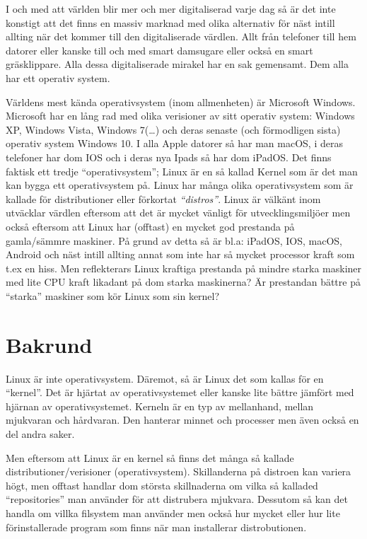\documentclass[a4paper, 12pt]{report}
\begin{document}
    I och med att världen blir mer och mer digitaliserad varje dag så är det inte konstigt att det finns en massiv marknad med olika alternativ för näst intill allting när det kommer till den digitaliserade värdlen. Allt från telefoner till hem datorer eller kanske till och med smart damsugare eller också en smart gräsklippare. Alla dessa digitaliserade mirakel har en sak gemensamt. Dem alla har ett operativ system.

    Världens mest kända operativsystem (inom allmenheten) är Microsoft Windows. Microsoft har en lång rad med olika verisioner av sitt operativ system\cite{windows}: Windows XP, Windows Vista, Windows 7(\dots) och deras senaste (och förmodligen sista) operativ system Windows 10.
     I alla Apple datorer så har man macOS, i deras telefoner har dom IOS och i deras nya Ipads så har dom iPadOS.
     Det finns faktisk ett tredje ``operativsystem''; Linux är en så kallad Kernel \cite{redhat} som är det man kan bygga ett operativsystem på. Linux har många olika operativsystem som är kallade för distributioner eller förkortat \textit{``distros''}. Linux är välkänt inom utväcklar värdlen eftersom att det är mycket vänligt för utvecklingsmiljöer men också eftersom att Linux har (offtast) en mycket god prestanda på gamla/sämmre maskiner. På grund av detta så är bl.a: iPadOS, IOS, macOS, Android och näst intill allting annat som inte har så mycket processor kraft som t.ex en hiss. Men reflekterars Linux kraftiga prestanda på mindre starka maskiner med lite CPU kraft likadant på dom starka maskinerna? Är prestandan bättre på ``starka'' maskiner som kör Linux som sin kernel?


\section{Bakrund}

    Linux är inte operativsystem. Däremot, så är Linux det som kallas för en ``kernel''\cite{redhat}. Det är hjärtat av operativsystemet eller kanske lite bättre jämfört med hjärnan av operativsystemet. Kerneln är en typ av mellanhand, mellan mjukvaran och hårdvaran. Den hanterar minnet och processer men även också en del andra saker.

    Men eftersom att Linux är en kernel så finns det många så kallade distributioner/verisioner (operativsystem). Skillanderna på distroen kan variera högt, men offtast handlar dom största skillnaderna om vilka så kalladed ``repositories'' man använder för att distrubera mjukvara. Dessutom så kan det handla om villka filsystem man använder men också hur mycket eller hur lite förinstallerade program som finns när man installerar distrobutionen.
    
\end{document}
